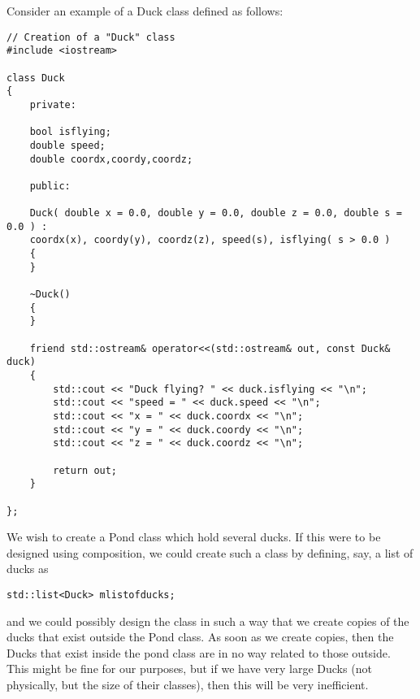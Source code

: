 Consider an example of a Duck class defined as follows:
\begin{lstlisting}
// Creation of a "Duck" class
#include <iostream>

class Duck
{
	private:
	
	bool isflying;
	double speed;
	double coordx,coordy,coordz;

	public:

	Duck( double x = 0.0, double y = 0.0, double z = 0.0, double s = 0.0 ) :
	coordx(x), coordy(y), coordz(z), speed(s), isflying( s > 0.0 )
	{
	}

	~Duck()
	{
	}

	friend std::ostream& operator<<(std::ostream& out, const Duck& duck)
	{
		std::cout << "Duck flying? " << duck.isflying << "\n";
		std::cout << "speed = " << duck.speed << "\n";
		std::cout << "x = " << duck.coordx << "\n";
		std::cout << "y = " << duck.coordy << "\n";
		std::cout << "z = " << duck.coordz << "\n";

		return out;
	}
	
};
\end{lstlisting}
We wish to create a Pond class which hold several ducks. If this were
to be designed using composition, we could create such a class by
defining, say, a list of ducks as 
\begin{verbatim}
std::list<Duck> mlistofducks;
\end{verbatim}
and we could possibly design the class in such a way that we create
copies of the ducks that exist outside the Pond class. As soon as we
create copies, then the Ducks that exist inside the pond class are
in no way related to those outside. This might be fine for our
purposes, but if we have very large Ducks (not physically, but the
size of their classes), then this will be very inefficient. 


